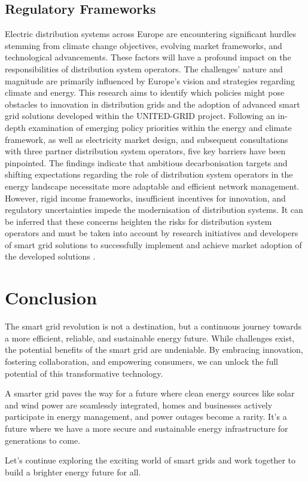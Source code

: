 \subsection{Regulatory Frameworks}
Electric distribution systems across Europe are encountering significant hurdles stemming from climate change objectives, evolving market frameworks, and technological advancements. These factors will have a profound impact on the responsibilities of distribution system operators. The challenges' nature and magnitude are primarily influenced by Europe's vision and strategies regarding climate and energy. This research aims to identify which policies might pose obstacles to innovation in distribution grids and the adoption of advanced smart grid solutions developed within the UNITED-GRID project. Following an in-depth examination of emerging policy priorities within the energy and climate framework, as well as electricity market design, and subsequent consultations with three partner distribution system operators, five key barriers have been pinpointed. The findings indicate that ambitious decarbonisation targets and shifting expectations regarding the role of distribution system operators in the energy landscape necessitate more adaptable and efficient network management. However, rigid income frameworks, insufficient incentives for innovation, and regulatory uncertainties impede the modernisation of distribution systems. It can be inferred that these concerns heighten the risks for distribution system operators and must be taken into account by research initiatives and developers of smart grid solutions to successfully implement and achieve market adoption of the developed solutions \cite{rossi2020study}. 

\newpage
\section*{Conclusion}
The smart grid revolution is not a destination, but a continuous journey towards a more efficient, reliable, and sustainable energy future. While challenges exist, the potential benefits of the smart grid are undeniable. By embracing innovation, fostering collaboration, and empowering consumers, we can unlock the full potential of this transformative technology.

A smarter grid paves the way for a future where clean energy sources like solar and wind power are seamlessly integrated, homes and businesses actively participate in energy management, and power outages become a rarity. It's a future where we have a more secure and sustainable energy infrastructure for generations to come.

Let's continue exploring the exciting world of smart grids and work together to build a brighter energy future for all.

